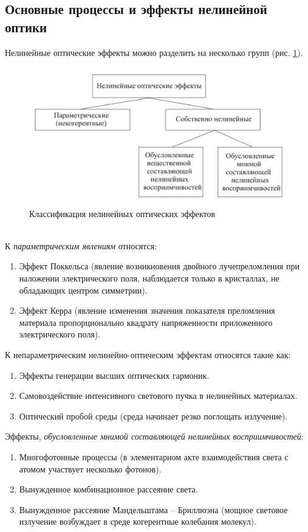 \subsection{Основные процессы и эффекты нелинейной оптики}
Нелинейные оптические эффекты можно разделить на несколько групп (рис. \ref{classific}). 
\begin{figure}[h!]
	\centering
	\includegraphics[width=0.7\linewidth]{images/classific.png}
	\caption{Классификация нелинейных оптических эффектов \cite{mifi2015}}
	\label{classific}
\end{figure}
\\
К \textit{параметрическим явлениям} относятся: 
\begin{enumerate}
\item   Эффект Поккельса (явление возникновения двойного лучепреломления при наложении электрического поля, наблюдается только в кристаллах, не обладающих центром симметрии).
\item  Эффект Керра (явление изменения значения показателя преломления материала пропорционально квадрату напряженности приложенного электрического поля).
\end{enumerate}
К непараметрическим нелинейно-оптическим эффектам относятся такие как:
\begin{enumerate}
\item  Эффекты генерации высших оптических гармоник.
\item  Самовоздействие интенсивного светового пучка в нелинейных материалах.
\item Оптический пробой среды (среда начинает резко поглощать излучение).
\end{enumerate}
Эффекты, \textit{обусловленные мнимой составляющей нелинейных восприимчивостей}:
\begin{enumerate}
\item  Многофотонные процессы (в элементарном акте взаимодействия света с атомом участвует несколько фотонов).
\item  Вынужденное комбинационное рассеяние света.
\item Вынужденное рассеяние Мандельштама – Бриллюэна  (мощное световое излучение возбуждает в среде когерентные колебания молекул).
\end{enumerate}


